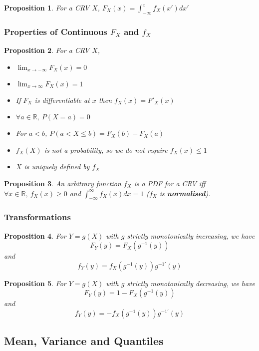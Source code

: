 \documentclass[12pt]{article}
\newtheorem*{prop*}{Proposition}
\theoremstyle{definition}
\newcommand{\R}{\mathbb{R}}
\begin{document}
\begin{prop*}
  For a CRV $X$, $F_X(x) = \int_{-\infty}^xf_X(x')dx'$
\end{prop*}

\subsubsection{Properties of Continuous $F_X$ and $f_X$}

\begin{prop*}
  For a CRV $X$,
  \begin{itemize}
    \item $\lim_{x \to -\infty}F_X(x) = 0$
    \item $\lim_{x \to \infty}F_X(x) = 1$
    \item If $F_X$ is differentiable at $x$ then $f_X(x) = F'_X(x)$
    \item $\forall a \in \R,\ P(X = a) = 0$
    \item For $a < b$, $P(a < X \leq b) = F_X(b) - F_X(a)$
    \item $f_X(X)$ is not a probability, so we do not require $f_X(x) \leq 1$
    \item $X$ is uniquely defined by $f_X$
  \end{itemize}
\end{prop*}

\begin{prop*}
  An arbitrary function $f_X$ is a PDF for a CRV iff $\forall x \in \R,\ f_X(x) \geq 0$ and $\int_{-\infty}^{\infty}f_X(x)dx = 1$ ($f_X$ is \textbf{normalised}).
\end{prop*}

\subsubsection{Transformations}

\begin{prop*}
  For $Y = g(X)$ with $g$ strictly monotonically increasing, we have
  $$F_Y(y) = F_X(g^{-1}(y))$$
  and
  $$f_Y(y) = f_X\left(g^{-1}(y)\right)g^{-1'}(y)$$
\end{prop*}

\begin{prop*}
  For $Y = g(X)$ with $g$ strictly monotonically decreasing, we have
  $$F_Y(y) = 1 - F_X(g^{-1}(y))$$
  and
  $$f_Y(y) = -f_X\left(g^{-1}(y)\right)g^{-1'}(y)$$
\end{prop*}

\subsection{Mean, Variance and Quantiles}
\end{document}
